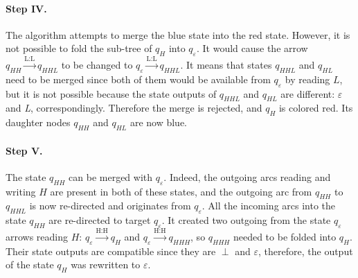 \paragraph{Step IV.}

The algorithm attempts to merge the blue state into the red state.
However, it is not possible to fold the sub-tree of $q_H$ into $q_\varepsilon$.
It would cause the arrow $q_{HH}\xrightarrow{\text{L:L}}q_{HHL}$ to be changed to $q_{\varepsilon}\xrightarrow{\text{L:L}}q_{HHL}$.
It means that states $q_{HHL}$ and $q_{HL}$ need to be merged since both of them would be available from $q_\varepsilon$ by reading $L$, but it is not possible because the state outputs of $q_{HHL}$ and $q_{HL}$ are different: \emph{$\varepsilon$} and \emph{L}, correspondingly.
Therefore the merge is rejected, and $q_H$ is colored red.
Its daughter nodes $q_{HH}$ and $q_{HL}$ are now blue.

\begin{center}
\end{center}

\paragraph{Step V.}

The state $q_{HH}$ can be merged with $q_\varepsilon$.
Indeed, the outgoing arcs reading and writing $H$ are present in both of these states, and the outgoing arc from $q_{HH}$ to $q_{HHL}$ is now re-directed and originates from $q_{\varepsilon}$.
All the incoming arcs into the state $q_{HH}$ are re-directed to target $q_\varepsilon$.
It created two outgoing from the state $q_\varepsilon$ arrows reading $H$: $q_{\varepsilon}\xrightarrow{\text{H:H}}q_{H}$ and $q_{\varepsilon}\xrightarrow{\text{H:H}}q_{HHH}$, so $q_{HHH}$ needed to be folded into $q_{H}$.
Their state outputs are compatible since they are $\perp$ and $\varepsilon$, therefore, the output of the state $q_{H}$ was rewritten to $\varepsilon$.


